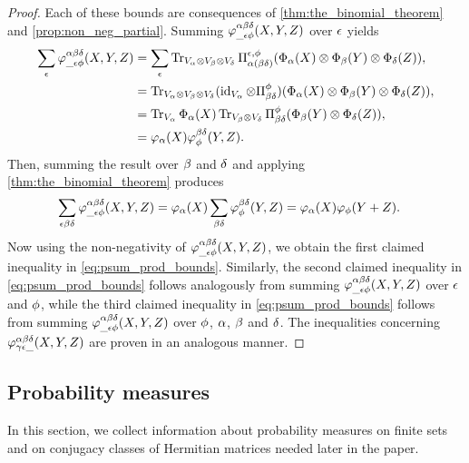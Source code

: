 \documentclass[notitlepage, 11pt, letterpaper]{amsart}
\begin{document}
\begin{proof}
    Each of these bounds are consequences of \cref{thm:the_binomial_theorem} and \cref{prop:non_neg_partial}.
    Summing $\varphi^{\alpha\beta\delta}_{\_\epsilon\phi}(X,Y,Z)$ over $\epsilon$ yields
    \begin{align}
        \label{eq:psum_yf_over_ye}
        \begin{split}
            \sum_{\epsilon} \varphi^{\alpha\beta\delta}_{\_\epsilon\phi}(X,Y,Z)
            &= \sum_{\epsilon} \operatorname{Tr}_{V_\alpha \otimes V_\beta \otimes V_\delta} \Pi_{\alpha (\beta \delta)}^{\epsilon, \phi} (\Phi_\alpha(X) \otimes \Phi_\beta(Y) \otimes \Phi_\delta(Z)), \\
            &= \operatorname{Tr}_{V_\alpha \otimes V_\beta \otimes V_\delta} (\operatorname{id}_{V_{\alpha}} \otimes \Pi^{\phi}_{\beta\delta}) (\Phi_\alpha(X) \otimes \Phi_\beta(Y) \otimes \Phi_\delta(Z)), \\
            &= \operatorname{Tr}_{V_\alpha} \Phi_\alpha(X) \operatorname{Tr}_{V_\beta \otimes V_\delta} \Pi^{\phi}_{\beta\delta} (\Phi_\beta(Y) \otimes \Phi_\delta(Z)), \\
            &= \varphi_{\alpha}(X)\varphi_{\phi}^{\beta\delta}(Y,Z).
        \end{split}
    \end{align}
    Then, summing the result over $\beta$ and $\delta$ and applying \cref{thm:the_binomial_theorem} produces
    \begin{align}
        \begin{split}
            \sum_{\epsilon\beta\delta} \varphi^{\alpha\beta\delta}_{\_\epsilon\phi}(X,Y,Z)
            &= \varphi_{\alpha}(X)\sum_{\beta\delta}\varphi_{\phi}^{\beta\delta}(Y,Z)
            = \varphi_{\alpha}(X)\varphi_{\phi}(Y+Z).
        \end{split}
    \end{align}
    Now using the non-negativity of $\varphi^{\alpha\beta\delta}_{\_\epsilon\phi}(X,Y,Z)$, we obtain the first claimed inequality in \cref{eq:psum_prod_bounds}.
    Similarly, the second claimed inequality in \cref{eq:psum_prod_bounds} follows analogously from summing 
    $\varphi^{\alpha\beta\delta}_{\_\epsilon\phi}(X,Y,Z)$ over $\epsilon$ and $\phi$,
    while the third claimed inequality in \cref{eq:psum_prod_bounds} follows from summing $\varphi^{\alpha\beta\delta}_{\_\epsilon\phi}(X,Y,Z)$ over $\phi$, $\alpha$, $\beta$ and $\delta$.
    The inequalities concerning $\varphi^{\alpha\beta\delta}_{\gamma\epsilon\_}(X,Y,Z)$ are proven in an analogous manner.
\end{proof}

\subsection{Probability measures}
\label{sec:background_probability}

In this section, we collect information about probability measures on finite sets and on conjugacy classes of Hermitian matrices needed later in the paper.
\end{document}
